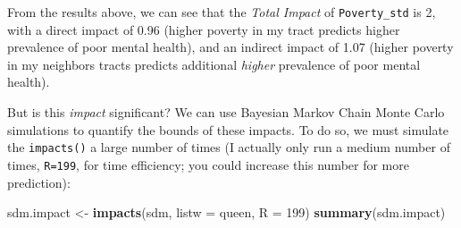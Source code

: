 \documentclass[
]{book}
\newenvironment{Shaded}{\begin{snugshade}}{\end{snugshade}}
\newcommand{\AttributeTok}[1]{\textcolor[rgb]{0.13,0.29,0.53}{#1}}
\newcommand{\DecValTok}[1]{\textcolor[rgb]{0.00,0.00,0.81}{#1}}
\newcommand{\FunctionTok}[1]{\textcolor[rgb]{0.13,0.29,0.53}{\textbf{#1}}}
\newcommand{\NormalTok}[1]{#1}
\newcommand{\OtherTok}[1]{\textcolor[rgb]{0.56,0.35,0.01}{#1}}
\begin{document}
From the results above, we can see that the \emph{Total Impact} of \texttt{Poverty\_std} is 2, with a direct impact of 0.96 (higher poverty in my tract predicts higher prevalence of poor mental health), and an indirect impact of 1.07 (higher poverty in my neighbors tracts predicts additional \emph{higher} prevalence of poor mental health).

But is this \emph{impact} significant? We can use Bayesian Markov Chain Monte Carlo simulations to quantify the bounds of these impacts. To do so, we must simulate the \texttt{impacts()} a large number of times (I actually only run a medium number of times, \texttt{R=199}, for time efficiency; you could increase this number for more prediction):

\begin{Shaded}
\begin{Highlighting}[]
\NormalTok{sdm.impact }\OtherTok{\textless{}{-}} \FunctionTok{impacts}\NormalTok{(sdm, }\AttributeTok{listw =}\NormalTok{ queen, }\AttributeTok{R =} \DecValTok{199}\NormalTok{)}
\FunctionTok{summary}\NormalTok{(sdm.impact)}
\end{Highlighting}
\end{Shaded}
\end{document}
